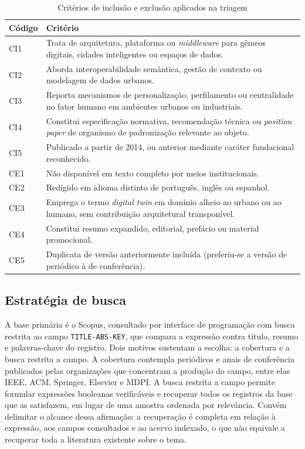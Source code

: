 \begin{table}[htb]
\centering
\caption{Critérios de inclusão e exclusão aplicados na triagem}
\label{tab:criterios}
\scriptsize
\begin{tabularx}{\textwidth}{@{}l X@{}}
\toprule
\textbf{Código} & \textbf{Critério} \\
\midrule
CI1 & Trata de arquitetura, plataforma ou \textit{middleware} para gêmeos digitais, cidades inteligentes ou espaços de dados. \\
CI2 & Aborda interoperabilidade semântica, gestão de contexto ou modelagem de dados urbanos. \\
CI3 & Reporta mecanismos de personalização, perfilamento ou centralidade no fator humano em ambientes urbanos ou industriais. \\
CI4 & Constitui especificação normativa, recomendação técnica ou \textit{position paper} de organismo de padronização relevante ao objeto. \\
CI5 & Publicado a partir de 2014, ou anterior mediante caráter fundacional reconhecido. \\
\midrule
CE1 & Não disponível em texto completo por meios institucionais. \\
CE2 & Redigido em idioma distinto de português, inglês ou espanhol. \\
CE3 & Emprega o termo \textit{digital twin} em domínio alheio ao urbano ou ao humano, sem contribuição arquitetural transponível. \\
CE4 & Constitui resumo expandido, editorial, prefácio ou material promocional. \\
CE5 & Duplicata de versão anteriormente incluída (preferiu-se a versão de periódico à de conferência). \\
\bottomrule
\end{tabularx}
\end{table}

\subsection{Estratégia de busca}

A base primária é o Scopus, consultado por interface de programação com busca restrita ao campo \texttt{TITLE-ABS-KEY}, que compara a expressão contra título, resumo e palavras-chave do registro. Dois motivos sustentam a escolha: a cobertura e a busca restrita a campo. A cobertura contempla periódicos e anais de conferência publicados pelas organizações que concentram a produção do campo, entre elas IEEE, ACM, Springer, Elsevier e MDPI. A busca restrita a campo permite formular expressões booleanas verificáveis e recuperar todos os registros da base que as satisfazem, em lugar de uma amostra ordenada por relevância. Convém delimitar o alcance dessa afirmação: a recuperação é completa em relação à expressão, aos campos consultados e ao acervo indexado, o que não equivale a recuperar toda a literatura existente sobre o tema.

